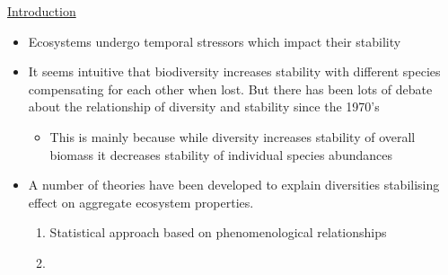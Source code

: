 \documentclass[11pt]{article}
\begin{document}
	\underline{Introduction}
	\begin{itemize}
		\item Ecosystems undergo temporal stressors which impact their stability
		\item It seems intuitive that biodiversity increases stability with different species compensating for each other when lost. But there has been lots of debate about the relationship of diversity and stability since the 1970's
		\begin{itemize}
			\item This is mainly because while diversity increases stability of overall biomass it decreases stability of individual species abundances
		\end{itemize}
		\item A number of theories have been developed to explain diversities stabilising effect on aggregate ecosystem properties.
		\begin{enumerate}
			\item Statistical approach based on phenomenological relationships
			\item  
		\end{enumerate}
	\end{itemize}
	
	
	
	
	
\end{document}
